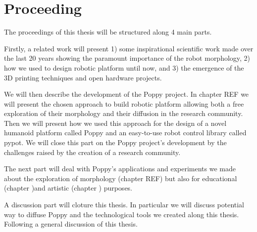 \section*{Proceeding} %
The proceedings of this thesis will be structured along 4 main parts.

Firstly, a related work will present 1) some inspirational scientific work made over the last 20 years showing the paramount importance of the robot morphology, 2) how we used to design robotic platform until now, and 3) the emergence of the 3D printing techniques and open hardware projects.

We will then describe the development of the Poppy project. In chapter REF we will present the chosen approach to build robotic platform allowing both a free exploration of their morphology and their diffusion in the research community. Then we will present how we used this approach for the design of a novel humanoid platform called Poppy and an easy-to-use robot control library called pypot. We will close this part on the Poppy project's development by the challenges raised by the creation of a research community.

The next part will deal with Poppy's applications and experiments we made about the exploration of morphology (chapter REF) but also for educational (chapter )and artistic (chapter ) purposes.

A discussion part will cloture this thesis. In particular we will discuss potential way to diffuse Poppy and the technological tools we created along this thesis. Following a general discussion of this thesis.

